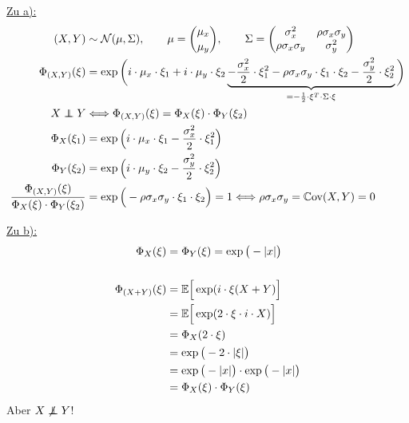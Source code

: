 \begin{lösung}
	\underline{Zu a):}
		\begin{align*}
		(X,Y)&\sim\mathcal{N}(\mu,\Sigma),\qquad\mu=\binom{\mu_x}{\mu_y},\qquad\Sigma=\begin{pmatrix}
			\sigma_x^2 & \rho\sigma_x\sigma_y\\
			\rho\sigma_x\sigma_y & \sigma_y^2
		\end{pmatrix}\\
		\Phi_{(X,Y)}(\xi)
		&=\exp\bigg(i\cdot\mu_x\cdot\xi_1+i\cdot\mu_y\cdot\xi_2\underbrace{-\frac{\sigma_x^2}{2}\cdot\xi_1^2-\rho\sigma_x\sigma_y\cdot\xi_1\cdot\xi_2-\frac{\sigma_y^2}{2}\cdot\xi_2^2}_{=-\frac{1}{2}\cdot\xi^T\cdot\Sigma\cdot\xi}\bigg)\\
		X\unab Y &\Longleftrightarrow\Phi_{(X,Y)}(\xi)=\Phi_X(\xi)\cdot\Phi_Y(\xi_2)\\
		\Phi_X(\xi_1)&=\exp\Big(i\cdot\mu_x\cdot\xi_1-\frac{\sigma_x^2}{2}\cdot\xi_1^2\Big)\\
		\Phi_Y(\xi_2)&=\exp\Big(i\cdot\mu_y\cdot\xi_2-\frac{\sigma_y^2}{2}\cdot\xi_2^2\Big)\\
		\frac{\Phi_{(X,Y)}(\xi)}{\Phi_X(\xi)\cdot\Phi_Y(\xi_2)}
		&=\exp\Big(-\rho\sigma_x\sigma_y\cdot\xi_1\cdot\xi_2\Big)=1
		\Longleftrightarrow\rho\sigma_x\sigma_y=\Cov(X,Y)=0
	\end{align*}	
		
	\underline{Zu b):}
	\begin{align*}
		\Phi_X(\xi)&=\Phi_Y(\xi)=\exp\big(-|x|\big)\nl
		\Phi_{(X+Y)}(\xi)
		&=\E\Big[\exp(i\cdot\xi(X+Y)\Big]\\
		&=\E\Big[\exp(2\cdot\xi\cdot i\cdot X)\Big]\\
		&=\Phi_X(2\cdot\xi)\\
		&=\exp\big(-2\cdot|\xi|\big)\\
		&=\exp\big(-|x|\big)\cdot\exp\big(-|x|\big)\\
		&=\Phi_X(\xi)\cdot\Phi_Y(\xi)
	\end{align*}
	Aber $X\not\unab Y$!
\end{lösung}

